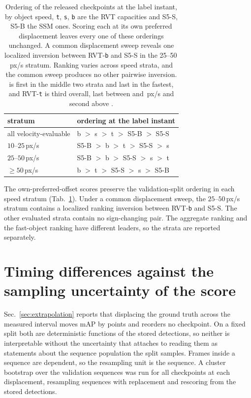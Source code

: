\documentclass[10pt,twocolumn,letterpaper]{article}
\begin{document}
\begin{table}[h]
\centering\footnotesize
\setlength{\tabcolsep}{3.4pt}\renewcommand{\arraystretch}{0.95}
\begin{tabular}{ll}
\toprule
stratum & ordering at the label instant \\
\midrule
all velocity-evaluable & b $>$ s $>$ t $>$ S5-B $>$ S5-S \\
$10$--$25$\,px/s & S5-B $>$ b $>$ t $>$ S5-S $>$ s \\
$25$--$50$\,px/s & S5-B $>$ b $>$ S5-S $>$ s $>$ t \\
$\geq 50$\,px/s      & b $>$ t $>$ S5-S $>$ s $>$ S5-B \\
\bottomrule
\end{tabular}
\caption{Ordering of the \rankCkpts{} released checkpoints at the label instant, by object
speed, \texttt{t}, \texttt{s}, \texttt{b} are the RVT capacities and S5-S, S5-B the SSM ones. Scoring each at its own preferred displacement leaves every one of these
orderings unchanged. A common displacement sweep reveals one localized inversion
between RVT-\texttt{b} and S5-S in the 25--50\,px/s stratum. Ranking varies across
speed strata, and the common sweep produces no other pairwise inversion. \rankMover{}
is first in the middle two strata and last in the fastest, and RVT-\texttt{t} is third
overall, last between \mapCutMid{} and \mapCutHi\,px/s and second above \mapCutHi{}.}
\label{tab:ordering}
\end{table}

The own-preferred-offset scores preserve the validation-split ordering in each speed
stratum (Tab.~\ref{tab:ordering}). Under a common displacement sweep, the $25$--$50$\,px/s stratum
contains a localized ranking inversion between RVT-\texttt{b} and S5-S. The
other evaluated strata contain no sign-changing pair. The aggregate ranking and
the fast-object ranking have different leaders, so the strata are reported
separately.


\section{Timing differences against the sampling uncertainty of the score}
\label{sup:timing}

Sec.~\ref{sec:extrapolation} reports that displacing the ground truth across the measured interval moves
mAP by \mapCost{} points and reorders no checkpoint. On a fixed split both are
deterministic functions of the stored detections, so neither is interpretable without the
uncertainty that attaches to reading them as statements about the sequence population the
split samples. Frames inside a sequence are
dependent, so the resampling unit is the sequence. A cluster bootstrap over the
\outSeqsScanned{} validation sequences was run for all \rankCkpts{} checkpoints at each
displacement, resampling sequences with replacement and rescoring from the stored
detections.
\end{document}
